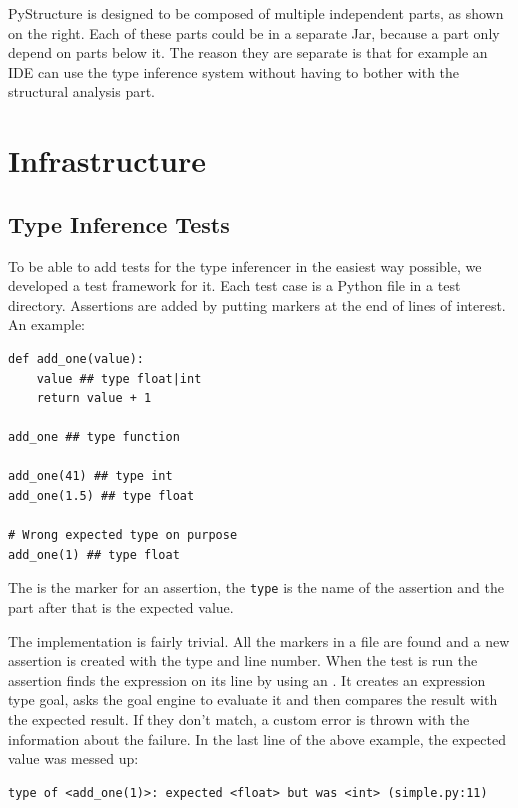 \documentclass[12pt,halfparskip,DIV11,BCOR10mm]{scrreprt}
\begin{document}
PyStructure is designed to be composed of multiple independent parts, as shown on the right. Each of these parts could be in a separate Jar, because a part only depend on parts below it. The reason they are separate is that for example an IDE can use the type inference system without having to bother with the structural analysis part.


\section{Infrastructure}

\subsection{Type Inference Tests}

To be able to add tests for the type inferencer in the easiest way possible, we developed a test framework for it. Each test case is a Python file in a test directory. Assertions are added by putting markers at the end of lines of interest. An example:

\begin{lstlisting}
def add_one(value):
    value ## type float|int
    return value + 1

add_one ## type function

add_one(41) ## type int
add_one(1.5) ## type float

# Wrong expected type on purpose
add_one(1) ## type float
\end{lstlisting}

The \code{##} is the marker for an assertion, the \texttt{type} is the name of the assertion and the part after that is the expected value.

The implementation is fairly trivial. All the markers in a file are found and a new assertion is created with the type and line number. When the test is run the assertion finds the expression on its line by using an . It creates an expression type goal, asks the goal engine to evaluate it and then compares the result with the expected result. If they don't match, a custom error  is thrown with the information about the failure. In the last line of the above example, the expected value was messed up:

\begin{verbatim}
type of <add_one(1)>: expected <float> but was <int> (simple.py:11)
\end{verbatim}
\end{document}
